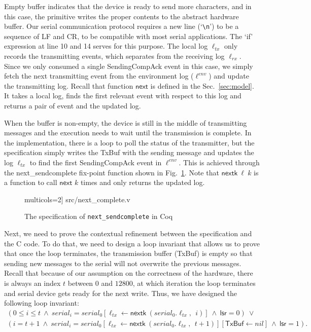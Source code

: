 Empty buffer indicates that the device is ready to send more characters, and in
this case, the primitive writes the proper contents to the abstract hardware
buffer. Our serial communication protocol requires a new line
(`\texttt{\textbackslash n}') to be a sequence of \textsf{LF} and \textsf{CR}, to
be compatible with most serial applications. The `if' expression at line 10 and
14 serves for this purpose. The local log $\ell_{tx}$  only records the
transmitting events, which separates from the receiving log $\ell_{rx}$. Since we
only consumed a single \textsf{SendingCompAck} event in this case, we simply
fetch the next transmitting event from the environment log ($\ell^{env}$) and
update the transmitting log. Recall that function $\textsf{next}$ is defined in
the Sec.~\ref{sec:model}. It takes a local log, finds the first relevant event
with respect to this log and returns a pair of event and the updated log.

When the buffer is non-empty, the device is still in the middle of transmitting
messages and the execution needs to wait until the transmission is complete. In
the implementation, there is a loop to poll the status of the transmitter, but
the specification simply writes the TxBuf with the sending message and updates
the log $\ell_{tx}$ to find the first \textsf{SendingCompAck} event in
$\ell^{env}$. This is achieved through the \textsf{next\_sendcomplete} fix-point
function shown in Fig.~\ref{fig:next_complete}. Note that
$\textsf{nextk}~\ell~k$ is a function to call $\textsf{next}$ $k$ times and only
returns the updated log.

\begin{figure}
	 multicols=2] {src/next_complete.v}
	\caption{The specification of \texttt{next\_sendcomplete} in Coq}
	\label{fig:next_complete}
\end{figure}

Next, we need to prove the contextual refinement between the specification and
the C code. To do that, we need to design a loop invariant that allows us to
prove that once the loop terminates, the transmission buffer (TxBuf) is empty so
that sending new messages to the serial will not overwrite the previous
messages. Recall that because of our assumption on the correctness of the
hardware, there is always an index $t$ between $0$ and $12800$, at which
iteration the loop terminates and serial device gets ready for the next write.
Thus, we have designed the following loop invariant:
\[
\begin{array}{l}
(0 \le i \le t ~\wedge~ serial_i = serial_0[\ell_{tx} \leftarrow \textsf{nextk}~ (serial_0.\ell_{tx},~~ i)] ~\wedge~ \textsf{lsr} = 0) ~\vee~ \\
(i = t + 1 ~\wedge~ serial_i = serial_0[\ell_{tx} \leftarrow \textsf{nextk}~ (serial_0.\ell_{tx}, ~~t + 1)][\textsf{TxBuf} \leftarrow nil] ~\wedge~ \textsf{lsr} = 1).
\end{array}
\]

